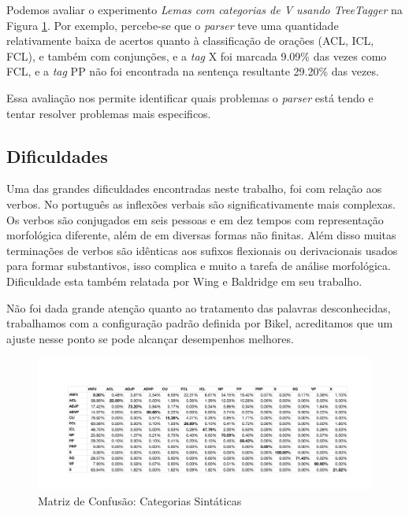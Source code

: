 Podemos avaliar o experimento \emph{Lemas com categorias de V usando TreeTagger} na Figura \ref{confusion_matrix_cat}. Por exemplo, percebe-se que o \emph{parser} teve uma quantidade relativamente baixa de acertos quanto à classificação de orações (ACL, ICL, FCL), e também com conjunções, e a \emph{tag} X foi marcada 9.09\% das vezes como FCL, e a \emph{tag} PP não foi encontrada na sentença resultante 29.20\% das vezes.

Essa avaliação nos permite identificar quais problemas o \emph{parser} está tendo e tentar resolver problemas mais especificos.

\subsection{Dificuldades}
\label{sec:dificuldades}

Uma das grandes dificuldades encontradas neste trabalho, foi com relação aos verbos. No português as inflexões verbais são significativamente mais complexas. Os verbos são conjugados em seis pessoas e em dez tempos com representação morfológica diferente, além de em diversas formas não finitas. Além disso muitas terminações de verbos são idênticas aos sufixos flexionais ou derivacionais usados para formar substantivos, isso complica e muito a tarefa de análise morfológica. Dificuldade esta também relatada por Wing e Baldridge em seu trabalho.

Não foi dada grande atenção quanto ao tratamento das palavras desconhecidas, trabalhamos com a configuração padrão definida por Bikel, acreditamos que um ajuste nesse ponto se pode alcançar desempenhos melhores.

\begin{figure}
  \begin{center}
	\includegraphics[scale=0.65]{score_confusion_cat.pdf}
	\caption{\label{confusion_matrix_cat} Matriz de Confusão: Categorias Sintáticas}		
  \end{center}
\end{figure}
